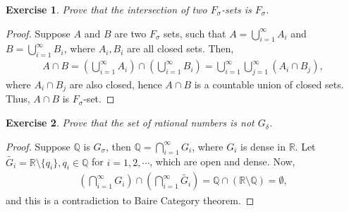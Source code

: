 \documentclass[11pt]{book}
\newtheorem{exercise}{Exercise}[chapter]
\theoremstyle{definition}
\numberwithin{equation}{chapter}
\begin{document}
\medskip

\begin{exercise}
Prove that the intersection of two $F_\sigma$-sets is $F_\sigma$.
\end{exercise}
\begin{proof}
Suppose $A$ and $B$ are two $F_\sigma$ sets, such that $A = \bigcup^\infty_{i=1} A_i$ and $B = \bigcup^\infty_{i=1} B_i$, where $A_i, B_i$ are all closed sets. Then,
\begin{align*}
    A \cap B = \left(\bigcup^\infty_{i=1} A_i\right) \cap \left(\bigcup^\infty_{i=1} B_i\right) = \bigcup^\infty_{i=1} \bigcup^\infty_{j=1} (A_i \cap B_j),
\end{align*}
where $A_i \cap B_j$ are also closed, hence $A \cap B$ is a countable union of closed sets. Thus, $A \cap B$ is $F_\sigma$-set.
\end{proof}

\medskip

\begin{exercise}
Prove that the set of rational numbers is not $G_\delta$.
\end{exercise}
\begin{proof}
Suppose $\mathbb{Q}$ is $G_\sigma$, then $\mathbb{Q} = \bigcap^\infty_{i=1} G_i$, where $G_i$ is dense in $\mathbb{R}$. Let $\widetilde{G_i} = \mathbb{R} \setminus \{q_i\}, q_i \in \mathbb{Q}$ for $i = 1,2,\cdots$, which are open and dense. Now,
\begin{align*}
    \left(\bigcap^\infty_{i=1}G_i\right) \cap \left(\bigcap^\infty_{i=1}\widetilde{G_i}\right) = \mathbb{Q} \cap (\mathbb{R} \setminus \mathbb{Q}) = \emptyset,
\end{align*}
and this is a contradiction to Baire Category theorem.
\end{proof}

\medskip
\end{document}
